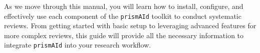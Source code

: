 As we move through this manual, you will learn how to install, configure, and effectively use each component of the \texttt{prismAId} toolkit to conduct systematic reviews. From getting started with basic setup to leveraging advanced features for more complex reviews, this guide will provide all the necessary information to integrate \texttt{prismAId} into your research workflow.
